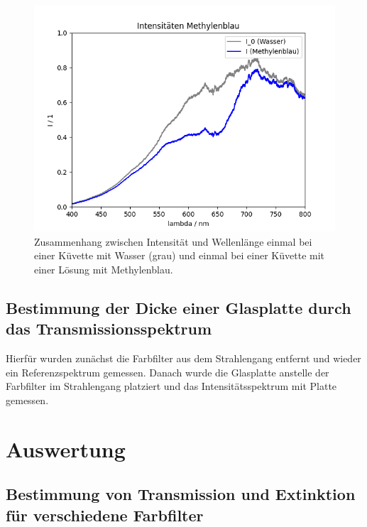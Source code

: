 \documentclass{article}
\begin{document}
\begin{figure}[H]
\centering
\caption{Zusammenhang zwischen Intensität und Wellenlänge einmal bei einer Küvette mit Wasser (grau) und einmal bei einer Küvette mit einer Lösung mit Methylenblau.}
\label{fig:I}
\includegraphics[scale=0.7]{Intensitaeten_Methyl.png}
\end{figure}





\subsection{Bestimmung der Dicke einer Glasplatte durch das Transmissionsspektrum}

Hierfür wurden zunächst die Farbfilter aus dem Strahlengang entfernt und wieder ein Referenzspektrum gemessen. Danach wurde die Glasplatte anstelle der Farbfilter im Strahlengang platziert und das Intensitätsspektrum mit Platte gemessen.


\section{Auswertung}

\subsection{Bestimmung von Transmission und Extinktion für verschiedene Farbfilter}
\end{document}
